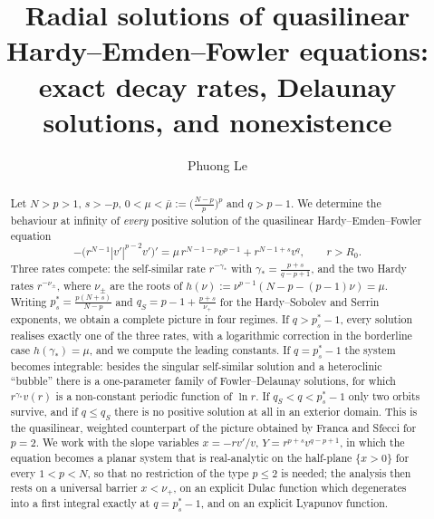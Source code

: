 \documentclass[11pt,reqno]{amsart}
\numberwithin{equation}{section}
\theoremstyle{plain}
\theoremstyle{definition}
\newcommand{\mub}{\bar\mu}
\newcommand{\gs}{\gamma_{*}}
\begin{document}
\title[Asymptotics for Hardy--Emden--Fowler equations]
{Radial solutions of quasilinear Hardy--Emden--Fowler equations:
exact decay rates, Delaunay solutions, and nonexistence}

\author{Phuong Le}
\address{Phuong Le$^{1,2}$ (ORCID: 0000-0003-4724-7118)\newline
	$^1$Faculty of Economic Mathematics, University of Economics and Law, Ho Chi Minh City, Vietnam; \newline
	$^2$Vietnam National University, Ho Chi Minh City, Vietnam}


\begin{abstract}
Let $N>p>1$, $s>-p$, $0<\mu<\mub:=\big(\frac{N-p}{p}\big)^{p}$ and $q>p-1$.
We determine the behaviour at infinity of \emph{every} positive solution of
the quasilinear Hardy--Emden--Fowler equation
\[
-\big(r^{N-1}|v'|^{p-2}v'\big)'=\mu\,r^{N-1-p}v^{p-1}+r^{N-1+s}v^{q},
\qquad r>R_{0}.
\]
Three rates compete: the self-similar rate $r^{-\gs}$ with
$\gs=\frac{p+s}{q-p+1}$, and the two Hardy rates $r^{-\nu_{\pm}}$, where
$\nu_{\pm}$ are the roots of $h(\nu):=\nu^{p-1}(N-p-(p-1)\nu)=\mu$. Writing
$p^{*}_{s}=\frac{p(N+s)}{N-p}$ and $q_{S}=p-1+\frac{p+s}{\nu_{+}}$ for the
Hardy--Sobolev and Serrin exponents, we obtain a complete picture in four
regimes. If $q>p^{*}_{s}-1$, every solution realises exactly one of the three
rates, with a logarithmic correction in the borderline case $h(\gs)=\mu$, and
we compute the leading constants. If $q=p^{*}_{s}-1$ the system becomes
integrable: besides the singular self-similar solution and a heteroclinic
``bubble'' there is a one-parameter family of Fowler--Delaunay solutions, for
which $r^{\gs}v(r)$ is a non-constant periodic function of $\ln r$. If
$q_{S}<q<p^{*}_{s}-1$ only two orbits survive, and if $q\le q_{S}$ there is no
positive solution at all in an exterior domain. This is the quasilinear,
weighted counterpart of the picture obtained by Franca and Sfecci for $p=2$.
We work with the slope variables $x=-rv'/v$, $Y=r^{p+s}v^{q-p+1}$, in which the
equation becomes a planar system that is real-analytic on the half-plane
$\{x>0\}$ for every $1<p<N$, so that no restriction of the type $p\le2$ is
needed; the analysis then rests on
a universal barrier $x<\nu_{+}$, on an explicit Dulac function which
degenerates into a first integral exactly at $q=p^{*}_{s}-1$, and on an
explicit Lyapunov function.
\end{abstract}
\end{document}

